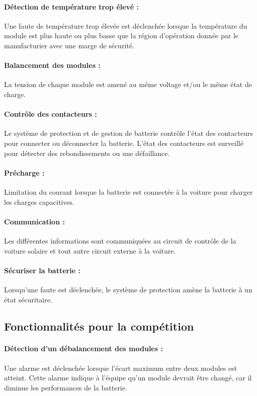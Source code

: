 		\paragraph{Détection de température trop élevé :}	
		Une faute de température trop élevée est déclenchée lorsque la température du module est plus haute ou plus basse que la région d'opération donnée par le manufacturier avec une marge de sécurité.
		
		\paragraph{Balancement des modules :}	
		La tension de chaque module est amené au même voltage et/ou le même état de charge.
		
		\paragraph{Contrôle des contacteurs :}	
		Le système de protection et de gestion de batterie contrôle l'état des contacteurs pour connecter ou déconnecter la batterie. L'état des contacteurs est surveillé pour détecter des rebondissements ou une défaillance.
		
		\paragraph{Précharge :}	
		Limitation du courant lorsque la batterie est connectée à la voiture pour charger les charges capacitives.
		
		\paragraph{Communication :}	
		Les différentes informations sont communiquées au circuit de contrôle de la voiture solaire et tout autre circuit externe à la voiture.
		
		\paragraph{Sécuriser la batterie :}	
		Lorsqu'une faute est déclenchée, le système de protection amène la batterie à un état sécuritaire. 
	
	\subsection{Fonctionnalités pour la compétition}
	
		\paragraph{Détection d'un débalancement des modules :}	
		Une alarme est déclenchée lorsque l'écart maximum entre deux modules est atteint. Cette alarme indique à l'équipe qu'un module devrait être changé, car il diminue les performances de la batterie.  
		
